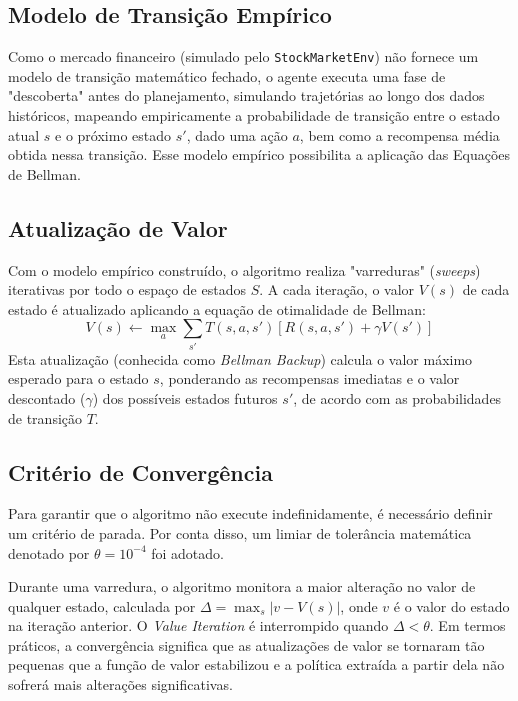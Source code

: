 \documentclass{article}
\begin{document}
\subsection{Modelo de Transição Empírico}
Como o mercado financeiro (simulado pelo \texttt{StockMarketEnv}) não fornece um modelo de transição matemático fechado, o agente executa uma fase de "descoberta" antes do planejamento, simulando trajetórias ao longo dos dados históricos, mapeando empiricamente a probabilidade de transição entre o estado atual $s$ e o próximo estado $s'$, dado uma ação $a$, bem como a recompensa média obtida nessa transição. Esse modelo empírico possibilita a aplicação das Equações de Bellman.

\subsection{Atualização de Valor}
Com o modelo empírico construído, o algoritmo realiza "varreduras" (\textit{sweeps}) iterativas por todo o espaço de estados $S$. A cada iteração, o valor $V(s)$ de cada estado é atualizado aplicando a equação de otimalidade de Bellman:
\begin{equation}
    V(s) \leftarrow \max_{a} \sum_{s'} T(s,a,s') \left[ R(s,a,s') + \gamma V(s') \right]
\end{equation}
Esta atualização (conhecida como \textit{Bellman Backup}) calcula o valor máximo esperado para o estado $s$, ponderando as recompensas imediatas e o valor descontado ($\gamma$) dos possíveis estados futuros $s'$, de acordo com as probabilidades de transição $T$.

\subsection{Critério de Convergência}
Para garantir que o algoritmo não execute indefinidamente, é necessário definir um critério de parada. Por conta disso, um limiar de tolerância matemática denotado por $\theta = 10^{-4}$ foi adotado.

Durante uma varredura, o algoritmo monitora a maior alteração no valor de qualquer estado, calculada por $\Delta = \max_s |v - V(s)|$, onde $v$ é o valor do estado na iteração anterior. O \textit{Value Iteration} é interrompido quando $\Delta < \theta$. Em termos práticos, a convergência significa que as atualizações de valor se tornaram tão pequenas que a função de valor estabilizou e a política extraída a partir dela não sofrerá mais alterações significativas.
\end{document}
